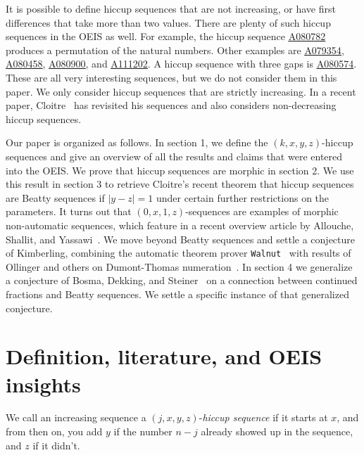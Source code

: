 \documentclass[12pt,reqno]{article}
\newcommand{\seqnum}[1]{\href{https://oeis.org/#1}{\rm \underline{#1}}}
\begin{document}
It is possible to define hiccup sequences that are not increasing, or have first differences
that take more than two values. There are plenty of such hiccup sequences in the OEIS as well.
For example, the hiccup sequence \seqnum{A080782} produces a permutation of the natural numbers.
Other examples are \seqnum{A079354}, \seqnum{A080458}, \seqnum{A080900},
and \seqnum{A111202}.
A hiccup sequence with three gaps is \seqnum{A080574}.
These are all very interesting sequences, but we
do not consider them in this paper. 
We only consider hiccup sequences that are strictly increasing.
In a recent paper, Cloitre~\cite{cloitre2025} has revisited his sequences
and also considers non-decreasing hiccup sequences.

Our paper is organized as follows. In section 1, we 
define the $(k,x,y,z)$-hiccup sequences and
give an overview of all the results and
claims that were entered into the OEIS.
We prove that hiccup sequences are morphic in section 2. 
We use this result in section 3 to retrieve
Cloitre's recent theorem that hiccup sequences are Beatty sequences if $|y-z|=1$ 
under certain further restrictions on the parameters. 
It turns out that $(0,x,1,z)$-sequences
are examples of morphic non-automatic sequences, which feature in a recent overview article
by 
Allouche, Shallit, and Yassawi~\cite{allouche2022}. 
We move beyond Beatty sequences and settle a conjecture
of Kimberling, combining the automatic theorem prover \texttt{Walnut}~\cite{mousavi}
with results of Ollinger and others on Dumont-Thomas numeration~\cite{carton2025,licofage}.
In section 4 we generalize a conjecture of Bosma, Dekking, and Steiner~\cite{bosma2018} on
a connection between continued fractions and Beatty sequences.
We settle a specific instance of that generalized conjecture.

\section{Definition, literature, and OEIS insights}

We call an increasing sequence a \((j, x, y, z)\)-\emph{hiccup sequence} if it starts at \(x\), and from then on, you add \(y\) if the 
number \(n - j\) already showed up in the sequence, and \(z\) if it didn’t.
\end{document}
